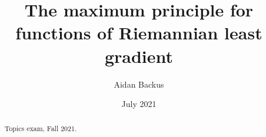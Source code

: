 \documentclass[reqno,12pt,letterpaper]{amsart}
\title[Least gradient maximum principle]{The maximum principle for functions of Riemannian least gradient}
\author{Aidan Backus}
\date{July 2021}
\theoremstyle{definition}
\numberwithin{equation}{section}
\begin{document}
\begin{abstract}
Topics exam, Fall 2021.
\end{abstract}

\maketitle



\let\clearpage\relax










\printbibliography
\end{document}
